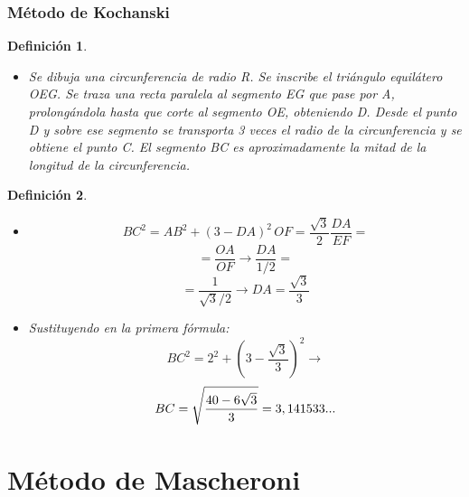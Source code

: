 \documentclass{beamer}
\newtheorem{definicion}{Definición}
\begin{document}
\begin{frame}

\frametitle{Método de Kochanski}

\begin{definicion}
  \begin{itemize}
  \item
 Se dibuja una circunferencia de radio R. Se inscribe el triángulo equilátero OEG. Se
 traza una recta paralela al segmento EG que pase por A, prolongándola hasta que corte al 
 segmento OE, obteniendo D. Desde el punto D y sobre ese segmento se transporta 3 veces 
 el radio de la circunferencia y se obtiene el punto C. El segmento BC es aproximadamente 
 la mitad de la longitud de la circunferencia.
  \end{itemize}
\end{definicion}
\end{frame} 
\begin{frame}
\begin{definicion}
  \begin{itemize}
  \item
$$BC^2=AB^2+(3-DA)^2 \,\!
OF= \frac{\sqrt{3}}{2}
\frac{DA}{EF} = $$
$$=\frac{OA}{OF} \rightarrow \frac{DA}{1/2}=$$
$$=\frac{1}{\sqrt{3}/2} \rightarrow DA=\frac{\sqrt{3}}{3}$$
 \pause
 \item
Sustituyendo en la primera fórmula:
$$BC^2= 2^2+\left (3-\frac{\sqrt{3}}{3}\right )^2 \rightarrow$$
$$BC = \sqrt{40-6 \sqrt{3} \over 3}=3,141533...$$

  \end{itemize}
\end{definicion}

\end{frame}

\section{Método de Mascheroni}
\end{document}

